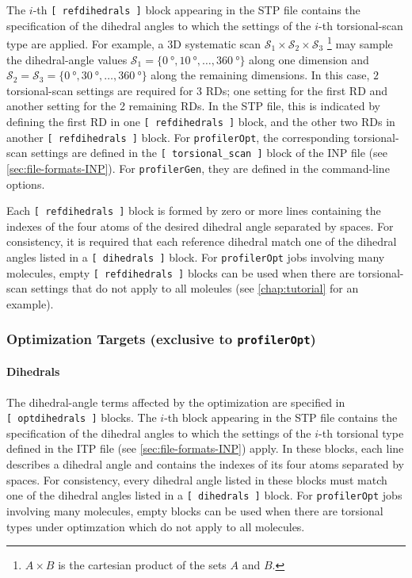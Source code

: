 \documentclass[10pt,a4paper,openany]{memoir}
\numberwithin{equation}{section}
\newcommand{\profileropt}[0]{\texttt{profilerOpt}}
\newcommand{\profilergen}[0]{\texttt{profilerGen}}
\begin{document}
The $i$-th \texttt{[~refdihedrals~]} block appearing in the STP file
contains the specification of the dihedral angles to which the
settings of the $i$-th torsional-scan type are applied.
%
For example, a 3D systematic scan
$\mathcal{S}_1 \times \mathcal{S}_2 \times \mathcal{S}_3$
\footnote{$A \times B$ is the cartesian product of the sets $A$ and
  $B$.}  may sample the dihedral-angle values
$\mathcal{S}_1 = \{\SI{0}{\degree}, \SI{10}{\degree}, \ldots,
\SI{360}{\degree}\}$ along one dimension and
$\mathcal{S}_2 = \mathcal{S}_3 = \{\SI{0}{\degree}, \SI{30}{\degree},
\ldots, \SI{360}{\degree}\}$ along the remaining dimensions.
%
In this case, $2$ torsional-scan settings are required for $3$ RDs;
one setting for the first RD and another setting for the 2 remaining RDs.
%
In the STP file, this is indicated by defining the first RD in one
\texttt{[~refdihedrals~]} block, and the other two RDs in another
\texttt{[~refdihedrals~]} block.
%
For \profileropt{}, the corresponding torsional-scan settings are
defined in the \texttt{[~torsional\_scan~]} block of the INP file (see
\autoref{sec:file-formats-INP}).
%
For \profilergen{}, they are defined in the command-line options.

Each \texttt{[~refdihedrals~]} block is formed by zero or more lines
containing the indexes of the four atoms of the desired dihedral angle
separated by spaces. For consistency, it is required that each
reference dihedral match one of the dihedral angles listed in a
\texttt{[~dihedrals~]} block. For \profileropt{} jobs involving many
molecules, empty \texttt{[~refdihedrals~]} blocks can be used when
there are torsional-scan settings that do not apply to all moleules
(see \autoref{chap:tutorial} for an example).

\subsubsection{Optimization Targets (exclusive to \profileropt{})}
\label{sec:stp-optterms}

\paragraph{Dihedrals}

The dihedral-angle terms affected by the optimization are specified in
\texttt{[~optdihedrals~]} blocks. The $i$-th block appearing in the
STP file contains the specification of the dihedral angles to which
the settings of the $i$-th torsional type defined in the ITP file (see
\autoref{sec:file-formats-INP}) apply.  In these blocks, each line
describes a dihedral angle and contains the indexes of its four atoms
separated by spaces. For consistency, every dihedral angle listed in
these blocks must match one of the dihedral angles listed in a
\texttt{[~dihedrals~]} block.  For \profileropt{} jobs involving many
molecules, empty blocks can be used when there are torsional types
under optimzation which do not apply to all molecules.
\end{document}

